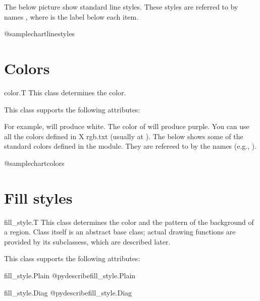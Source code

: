 \documentclass{howto}
\begin{document}

The below picture show standard line styles.
These styles are referred to by names
, where  is the label below each item.

@samplechart{linestyles}

\section{Colors}

\begin{classdesc*}{color.T}
This class determines the color.
\end{classdesc*}

This class supports the following attributes:



For example,  will produce white.
The color of  will produce purple.
You can use all the colors defined in X rgb.txt (usually at
). The below shows some of the standard
colors defined in the module.  They are refereed to by the names
 (e.g., ).

@samplechart{colors}

\section{Fill styles}

\begin{classdesc*}{fill_style.T}
This class determines the color and the pattern of the
background of a region. Class  itself is an
abstract base class; actual drawing functions are provided by
its subclassess, which are described later.
\end{classdesc*}

This class supports the following attributes:



\begin{classdesc*}{fill_style.Plain}
@pydescribe{fill_style.Plain}
\end{classdesc*}

\begin{classdesc*}{fill_style.Diag}
@pydescribe{fill_style.Diag}
\end{classdesc*}
\end{document}
